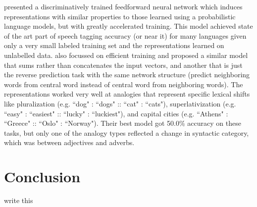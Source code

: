 \documentclass[11pt,letterpaper]{article}
\begin{document}
\cite{rami} presented a discriminatively trained feedforward neural network
which induces representations with similar properties to those learned using
a probabilistic language models, but with greatly accelerated training.
This model achieved state of the art part of speech tagging accuracy (or near it)
for many languages given only a very small labeled training set and the representations
learned on unlabelled data.
\cite{DBLP:journals/corr/abs-1301-3781} also focussed on efficient training and
proposed a similar model that sums rather than concatenates the input vectors,
and another that is just the reverse prediction task with the same network structure
(predict neighboring words from central word instead of central word from neighboring words).
The representations worked very well at analogies that represent specific lexical shifts
like pluralization (e.g. ``dog" : ``dogs" :: ``cat" : ``cats"), superlativization
(e.g. ``easy" : ``easiest" :: ``lucky" : ``luckiest"), and
capital cities (e.g. ``Athens" : ``Greece" :: ``Oslo" : ``Norway").
Their best model got 50.0\% accuracy on these tasks, but only one of the analogy types
reflected a change in syntactic category, which was between adjectives and adverbs.


\section{Conclusion} %
write this



{}

\end{document}
